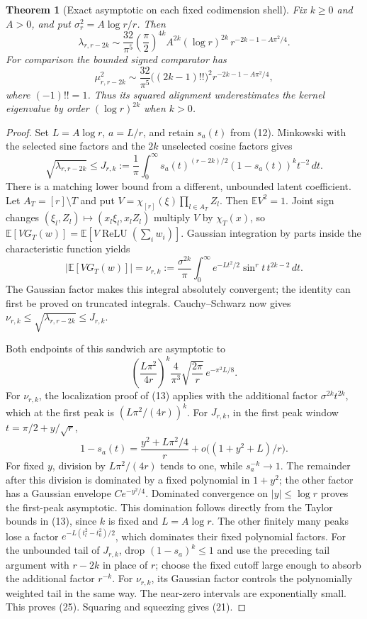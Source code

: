 \documentclass[11pt]{article}
\newtheorem{theorem}{Theorem}\newtheorem{lemma}[theorem]{Lemma}
\newcommand{\E}{\mathbb E}\newcommand{\R}{\mathbb R}
\newcommand{\relu}{\operatorname{ReLU}}
\begin{document}
\begin{theorem}[Exact asymptotic on each fixed codimension shell]
Fix $k\ge0$ and $A>0$, and put $\sigma_r^2=A\log r/r$. Then
\[
 \boxed{\quad
 \lambda_{r,r-2k}\sim
 \frac{32}{\pi^5}\left(\frac\pi2\right)^{4k}A^{2k}
 (\log r)^{2k}\,r^{-2k-1-A\pi^2/4}.
 \quad}                                                \tag{21}
\]
For comparison the bounded signed comparator has
\[
 \mu_{r,r-2k}^2\sim
 \frac{32}{\pi^5}\bigl((2k-1)!!\bigr)^2
                         r^{-2k-1-A\pi^2/4},            \tag{22}
\]
where $(-1)!!=1$. Thus its squared alignment underestimates the
kernel eigenvalue by order $(\log r)^{2k}$ when $k>0$.
\end{theorem}
\begin{proof}
Set $L=A\log r$, $a=L/r$, and retain $s_a(t)$ from (12).
Minkowski with the selected sine factors and the $2k$ unselected cosine
factors gives
\[
 \sqrt{\lambda_{r,r-2k}}\le
 J_{r,k}:=\frac1\pi\int_0^\infty
             s_a(t)^{(r-2k)/2}(1-s_a(t))^k t^{-2}\,dt.
 \tag{23}
\]
There is a matching lower bound from a different, unbounded latent
coefficient. Let $A_T=[r]\setminus T$ and put
$V=\chi_{[r]}(\xi)\prod_{l\in A_T}Z_l$.
Then $\E V^2=1$. Joint sign changes
$(\xi_l,Z_l)\mapsto(x_l\xi_l,x_lZ_l)$ multiply $V$ by
$\chi_T(x)$, so $\E[V G_T(w)]=\E[V\relu(\sum_i w_i)]$.
Gaussian integration by parts inside the characteristic function yields
\[
 \left|\E[V G_T(w)]\right|
 =\nu_{r,k}:=\frac{\sigma^{2k}}\pi\int_0^\infty
       e^{-Lt^2/2}\sin^r t\,t^{2k-2}\,dt.
 \tag{24}
\]
The Gaussian factor makes this integral absolutely convergent; the
identity can first be proved on truncated integrals. Cauchy--Schwarz
now gives $\nu_{r,k}\le\sqrt{\lambda_{r,r-2k}}\le J_{r,k}$.

Both endpoints of this sandwich are asymptotic to
\[
 \left(\frac{L\pi^2}{4r}\right)^k
       \frac4{\pi^3}\sqrt{\frac{2\pi}{r}}\,e^{-\pi^2L/8}.
 \tag{25}
\]
For $\nu_{r,k}$, the localization proof of (13) applies with the
additional factor $\sigma^{2k}t^{2k}$, which at the first peak is
$(L\pi^2/(4r))^k$.
For $J_{r,k}$, in the first peak window $t=\pi/2+y/\sqrt r$,
\[
 1-s_a(t)=\frac{y^2+L\pi^2/4}{r}
       +o\bigl((1+y^2+L)/r\bigr).
\]
For fixed $y$, division by $L\pi^2/(4r)$ tends to one, while
$s_a^{-k}\to1$. The remainder after this division is dominated by a
fixed polynomial in $1+y^2$; the other factor has a Gaussian envelope
$C e^{-y^2/4}$. Dominated convergence on $|y|\le\log r$ proves
the first-peak asymptotic. This domination follows directly from the
Taylor bounds in (13), since $k$ is fixed and $L=A\log r$.
The other finitely many peaks lose a factor
$e^{-L(t_l^2-t_0^2)/2}$, which dominates their fixed polynomial factors.
For the unbounded tail of $J_{r,k}$, drop $(1-s_a)^k\le1$ and use
the preceding tail argument with $r-2k$ in place of $r$; choose the
fixed cutoff large enough to absorb the additional factor $r^{-k}$.
For $\nu_{r,k}$, its Gaussian factor controls the polynomially weighted
tail in the same way. The near-zero intervals are exponentially small.
This proves (25). Squaring and squeezing gives (21).


\end{proof}
\end{document}
